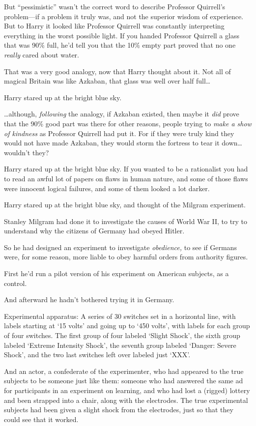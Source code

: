 But ``pessimistic'' wasn't the correct word to describe Professor
Quirrell's problem---if a problem it truly was, and not the superior
wisdom of experience. But to Harry it looked like Professor Quirrell was
constantly interpreting everything in the worst possible light. If you
handed Professor Quirrell a glass that was 90\% full, he'd tell you that
the 10\% empty part proved that no one \emph{really} cared about water.

That was a very good analogy, now that Harry thought about it. Not all
of magical Britain was like Azkaban, that glass was well over half
full\ldots{}

Harry stared up at the bright blue sky.

\ldots{}although, \emph{following} the analogy, if Azkaban existed, then
maybe it \emph{did} prove that the 90\% good part was there for other
reasons, people trying to \emph{make a show of kindness} as Professor
Quirrell had put it. For if they were truly kind they would not have
made Azkaban, they would storm the fortress to tear it down\ldots{}
wouldn't they?

Harry stared up at the bright blue sky. If you wanted to be a
rationalist you had to read an awful lot of papers on flaws in human
nature, and some of those flaws were innocent logical failures, and some
of them looked a lot darker.

Harry stared up at the bright blue sky, and thought of the Milgram
experiment.

Stanley Milgram had done it to investigate the causes of World War II,
to try to understand why the citizens of Germany had obeyed Hitler.

So he had designed an experiment to investigate \emph{obedience,} to see
if Germans were, for some reason, more liable to obey harmful orders
from authority figures.

First he'd run a pilot version of his experiment on American subjects,
as a control.

And afterward he hadn't bothered trying it in Germany.

Experimental apparatus: A series of 30 switches set in a horizontal
line, with labels starting at `15 volts' and going up to `450 volts',
with labels for each group of four switches. The first group of four
labeled `Slight Shock', the sixth group labeled `Extreme Intensity
Shock', the seventh group labeled `Danger: Severe Shock', and the two
last switches left over labeled just `XXX'.

And an actor, a confederate of the experimenter, who had appeared to the
true subjects to be someone just like them: someone who had answered the
same ad for participants in an experiment on learning, and who had lost
a (rigged) lottery and been strapped into a chair, along with the
electrodes. The true experimental subjects had been given a slight shock
from the electrodes, just so that they could see that it worked.

